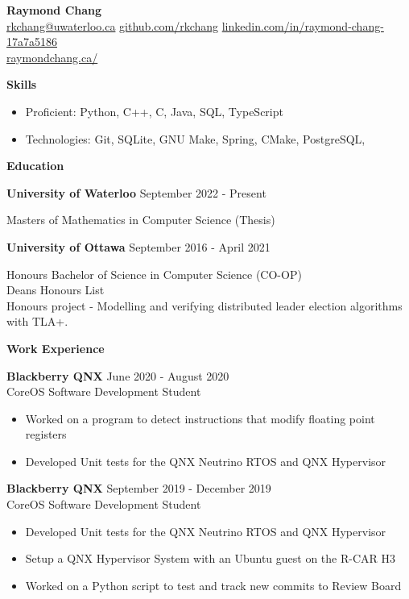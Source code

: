\documentclass[10pt]{article}
\begin{document}
\begin{center}
    {\huge\textbf{Raymond Chang}} \\
     \href{mailto:rkchang@uwaterloo.ca}{rkchang@uwaterloo.ca}  \space\space
     \url{github.com/rkchang} \space\space
     \url{linkedin.com/in/raymond-chang-17a7a5186} \\
     \url{raymondchang.ca/} \\ \end{center}

{\Large\textbf{Skills}}\space \hrulefill \begin{itemize}[noitemsep] \item Proficient: Python, C++, C, Java, SQL, TypeScript
    \item Technologies: Git, SQLite, GNU Make, Spring, CMake, PostgreSQL,
\end{itemize}

\smallskip

{\Large\textbf{Education}}\space \hrulefill

\textbf{University of Waterloo} \hfill September 2022 - Present

Masters of Mathematics in Computer Science (Thesis)

\hfill

\textbf{University of Ottawa} \hfill September 2016 - April 2021

Honours Bachelor of Science in Computer Science (CO-OP) \\ Deans Honours List \\ Honours project - Modelling and verifying distributed leader election algorithms with TLA+.
\bigskip

{\Large\textbf{Work Experience}}\space \hrulefill

\textbf{Blackberry QNX} \hfill June 2020 - August 2020 \\
CoreOS Software Development Student
\begin{itemize}[noitemsep]
    \item Worked on a program to detect instructions that modify floating point registers
    \item Developed Unit tests for the QNX Neutrino RTOS and QNX Hypervisor
\end{itemize}

\textbf{Blackberry QNX}
\hfill September 2019 - December 2019 \\ CoreOS Software Development Student
\begin{itemize}[noitemsep]
    \item Developed Unit tests for the QNX Neutrino RTOS and QNX Hypervisor
    \item Setup a QNX Hypervisor System with an Ubuntu guest on the R-CAR H3
    \item Worked on a Python script to test and track new commits to Review Board
\end{itemize}
\end{document}
